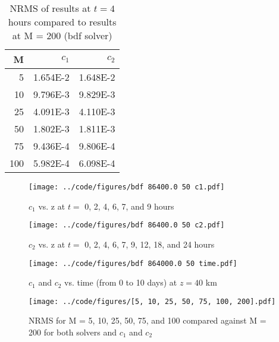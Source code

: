 \documentclass[twocolumn,10pt]{asme2ej}
\begin{document}
\begin{table}[tbh]
\begin{center}
\begin{tabular}{| r | r r |}
\hline
M & $c_{1}$ & $c_{2}$ \\
\hline
  5 & 1.654E-2 & 1.648E-2 \\
 10 & 9.796E-3 & 9.829E-3 \\
 25 & 4.091E-3 & 4.110E-3 \\
 50 & 1.802E-3 & 1.811E-3 \\
 75 & 9.436E-4 & 9.806E-4 \\
100 & 5.982E-4 & 6.098E-4 \\
\hline
\end{tabular}
\caption{NRMS of results at $t=4$ hours compared to results at M = 200 (bdf solver)}
\label{bdf_nrms_table}
\end{center}
\end{table}

\begin{figure}[thb]
\begin{center}
\texttt{[image: ../code/figures/bdf 86400.0 50 c1.pdf]}
\caption{$c_1$ vs. z at $t = $ 0, 2, 4, 6, 7, and 9 hours}
\label{c1_plot}
\end{center}
\end{figure}

\begin{figure}[thb]
\begin{center}
\texttt{[image: ../code/figures/bdf 86400.0 50 c2.pdf]}
\caption{$c_2$ vs. z at $t = $ 0, 2, 4, 6, 7, 9, 12, 18, and 24 hours}
\label{c2_plot}
\end{center}
\end{figure}

\begin{figure}[thb]
\begin{center}
\texttt{[image: ../code/figures/bdf 864000.0 50 time.pdf]}
\caption{$c_1$ and $c_2$ vs. time (from 0 to 10 days) at $z = 40$ km}
\label{40km_plot}
\end{center}
\end{figure}

\begin{figure}[thb]
\begin{center}
\texttt{[image: ../code/figures/[5, 10, 25, 50, 75, 100, 200].pdf]}
\caption{NRMS for M = 5, 10, 25, 50, 75, and 100 compared against M = 200 for both solvers and $c_1$ and $c_2$}
\label{NRMS_plot}
\end{center}
\end{figure}
\end{document}
